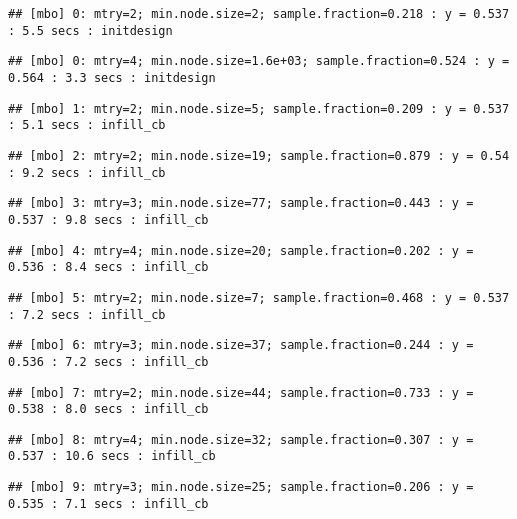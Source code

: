 \documentclass[
]{article}
\begin{document}
\begin{verbatim}
## [mbo] 0: mtry=2; min.node.size=2; sample.fraction=0.218 : y = 0.537 : 5.5 secs : initdesign
\end{verbatim}

\begin{verbatim}
## [mbo] 0: mtry=4; min.node.size=1.6e+03; sample.fraction=0.524 : y = 0.564 : 3.3 secs : initdesign
\end{verbatim}

\begin{verbatim}
## [mbo] 1: mtry=2; min.node.size=5; sample.fraction=0.209 : y = 0.537 : 5.1 secs : infill_cb
\end{verbatim}

\begin{verbatim}
## [mbo] 2: mtry=2; min.node.size=19; sample.fraction=0.879 : y = 0.54 : 9.2 secs : infill_cb
\end{verbatim}

\begin{verbatim}
## [mbo] 3: mtry=3; min.node.size=77; sample.fraction=0.443 : y = 0.537 : 9.8 secs : infill_cb
\end{verbatim}

\begin{verbatim}
## [mbo] 4: mtry=4; min.node.size=20; sample.fraction=0.202 : y = 0.536 : 8.4 secs : infill_cb
\end{verbatim}

\begin{verbatim}
## [mbo] 5: mtry=2; min.node.size=7; sample.fraction=0.468 : y = 0.537 : 7.2 secs : infill_cb
\end{verbatim}

\begin{verbatim}
## [mbo] 6: mtry=3; min.node.size=37; sample.fraction=0.244 : y = 0.536 : 7.2 secs : infill_cb
\end{verbatim}

\begin{verbatim}
## [mbo] 7: mtry=2; min.node.size=44; sample.fraction=0.733 : y = 0.538 : 8.0 secs : infill_cb
\end{verbatim}

\begin{verbatim}
## [mbo] 8: mtry=4; min.node.size=32; sample.fraction=0.307 : y = 0.537 : 10.6 secs : infill_cb
\end{verbatim}

\begin{verbatim}
## [mbo] 9: mtry=3; min.node.size=25; sample.fraction=0.206 : y = 0.535 : 7.1 secs : infill_cb
\end{verbatim}
\end{document}
